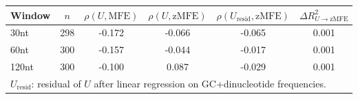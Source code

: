 \begin{center}\small
\begin{tabular}{lccccc}\toprule
Window & $n$ & $\rho(U,\mathrm{MFE})$ & $\rho(U,\mathrm{zMFE})$ & $\rho(U_{\mathrm{resid}},\mathrm{zMFE})$ & $\Delta R^2_{U\to \mathrm{zMFE}}$ \\
\midrule
30nt & 298 & -0.172 & -0.066 & -0.065 & 0.001 \\
60nt & 300 & -0.157 & -0.044 & -0.017 & 0.001 \\
120nt & 300 & -0.100 & 0.087 & -0.029 & 0.001 \\
\bottomrule
\multicolumn{6}{l}{\footnotesize $U_{\mathrm{resid}}$: residual of $U$ after linear regression on GC+dinucleotide frequencies.} \\
\end{tabular}
\end{center}
